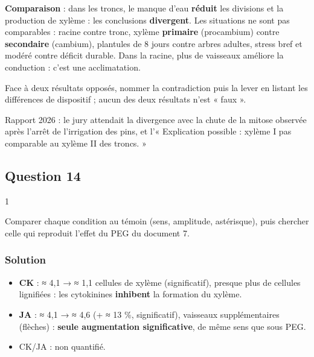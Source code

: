 \documentclass[11pt,a4paper]{article}
\providecommand{\tightlist}{\setlength{\itemsep}{0pt}\setlength{\parskip}{0pt}}
\begin{document}
\textbf{Comparaison} : dans les troncs, le manque d'eau \textbf{réduit} les divisions et la production de xylème : les conclusions \textbf{divergent}. Les situations ne sont pas comparables : racine contre tronc, xylème \textbf{primaire} (procambium) contre \textbf{secondaire} (cambium), plantules de 8 jours contre arbres adultes, stress bref et modéré contre déficit durable. Dans la racine, plus de vaisseaux améliore la conduction : c'est une acclimatation.

\begin{methode}

Face à deux résultats opposés, nommer la contradiction puis la lever en listant les différences de dispositif ; aucun des deux résultats n'est « faux ».

\end{methode}

\begin{jury}

Rapport 2026 : le jury attendait la divergence avec la chute de la mitose observée après l'arrêt de l'irrigation des pins, et l'« Explication possible : xylème I pas comparable au xylème II des troncs. »

\end{jury}

\hypertarget{question-14}{%
\subsection{Question 14}\label{question-14}}

\begin{indication}{1}

Comparer chaque condition au témoin (sens, amplitude, astérisque), puis chercher celle qui reproduit l'effet du PEG du document 7.

\end{indication}

\hypertarget{solution-13}{%
\subsubsection{Solution}\label{solution-13}}

\begin{itemize}
\tightlist
\item
  \textbf{CK} : ≈ 4,1 → ≈ 1,1 cellules de xylème (significatif), presque plus de cellules lignifiées : les cytokinines \textbf{inhibent} la formation du xylème.
\item
  \textbf{JA} : ≈ 4,1 → ≈ 4,6 (+ ≈ 13 \%, significatif), vaisseaux supplémentaires (flèches) : \textbf{seule augmentation significative}, de même sens que sous PEG.
\item
  CK/JA : non quantifié.
\end{itemize}
\end{document}
